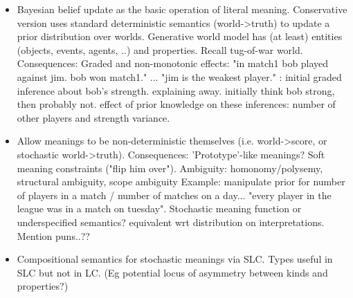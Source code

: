 \documentclass[12pt]{article}
\begin{document}




%



\begin{itemize}  
\item  Bayesian belief update as the basic operation of literal meaning.
\subitem     Conservative version uses standard deterministic semantics (world->truth) to update a prior distribution over worlds.
\subitem     Generative world model has (at least) entities (objects, events, agents, ..) and properties. Recall tug-of-war world.
\subitem     Consequences:  Graded and non-monotonic effects: 
"in match1 bob played against jim. bob won match1." ... "jim is the weakest player." : initial graded inference about bob's strength. explaining away. initially think bob strong, then probably not. effect of prior knowledge on these inferences: number of other players and strength variance.


\item  Allow meanings to be non-deterministic themselves (i.e. world->score, or stochastic world->truth).
\subitem     Consequences: 'Prototype'-like meanings? Soft meaning constraints ("flip him over").
\subitem     Ambiguity:  homonomy/polysemy, structural ambiguity, scope ambiguity 
\subitem     Example: manipulate prior for number of players in a match / number of matches on a day... "every player in the league was in a match on tuesday".
\subitem     Stochastic meaning function or underspecified semantics? equivalent wrt distribution on interpretations.
\subitem     Mention puns..??
        
\item  Compositional semantics for stochastic meanings via SLC.
\subitem     Types useful in SLC but not in LC. (Eg potential locus of asymmetry between kinds and properties?)

\end{itemize}
\end{document}
